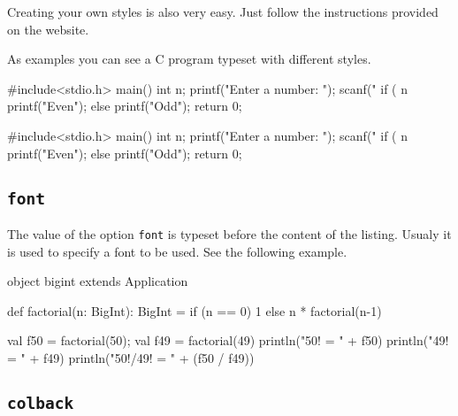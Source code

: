 \documentclass[10pt,a4paper]{article}
\begin{document}
Creating your own styles is also very easy. Just follow the instructions
provided on the website.

As examples you can see a C program typeset with different styles.

\begin{Example}
\noindent
\begin{minipage}[t]{0.49\linewidth}
  \begin{pygmented}[lang=c,gobble=4,sty=murphy]
    #include<stdio.h>
    main()
    { int n;
      printf("Enter a number: ");
      scanf("%
      if ( n%
         printf("Even\n");
      else
         printf("Odd\n");
      return 0;
    }
  \end{pygmented}
\end{minipage}
\hfil
\begin{minipage}[t]{0.49\linewidth}
  \begin{pygmented}[lang=c,gobble=4,sty=trac]
    #include<stdio.h>
    main()
    { int n;
      printf("Enter a number: ");
      scanf("%
      if ( n%
         printf("Even\n");
      else
         printf("Odd\n");
      return 0;
    }
  \end{pygmented}
\end{minipage}
\end{Example}

\subsection{\texttt{font}}

The value of the option \verb|font| is typeset before the content of the
listing. Usualy it is used to specify a font to be used. See the
following example.

\begin{Example}
\begin{pygmented}[lang=scala,font=\rmfamily\scshape\large]
object bigint extends Application {
  def factorial(n: BigInt): BigInt =
    if (n == 0) 1 else n * factorial(n-1)

  val f50 = factorial(50); val f49 = factorial(49)
  println("50! = " + f50)
  println("49! = " + f49)
  println("50!/49! = " + (f50 / f49))
}
\end{pygmented}
\end{Example}

\subsection{\texttt{colback}}
\end{document}
